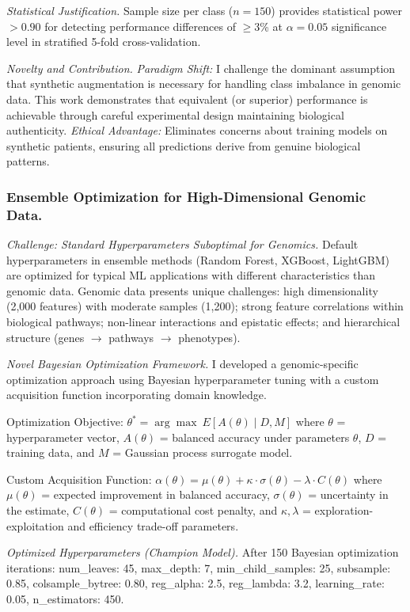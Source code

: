 \documentclass[manuscript, screen, review]{jair}
\begin{document}
\emph{Statistical Justification.} Sample size per class ($n=150$) provides statistical power $> 0.90$ for detecting performance differences of $\geq$3\% at $\alpha=0.05$ significance level in stratified 5-fold cross-validation.

\emph{Novelty and Contribution.} \emph{Paradigm Shift:} I challenge the dominant assumption that synthetic augmentation is necessary for handling class imbalance in genomic data. This work demonstrates that equivalent (or superior) performance is achievable through careful experimental design maintaining biological authenticity. \emph{Ethical Advantage:} Eliminates concerns about training models on synthetic patients, ensuring all predictions derive from genuine biological patterns.

\subsubsection{Ensemble Optimization for High-Dimensional Genomic Data.}
\label{sec:ensemble}

\emph{Challenge: Standard Hyperparameters Suboptimal for Genomics.} Default hyperparameters in ensemble methods (Random Forest, XGBoost, LightGBM) are optimized for typical ML applications with different characteristics than genomic data. Genomic data presents unique challenges: high dimensionality (2,000 features) with moderate samples (1,200); strong feature correlations within biological pathways; non-linear interactions and epistatic effects; and hierarchical structure (genes $\to$ pathways $\to$ phenotypes).

\emph{Novel Bayesian Optimization Framework.} I developed a genomic-specific optimization approach using Bayesian hyperparameter tuning with a custom acquisition function incorporating domain knowledge.

Optimization Objective: $\theta^* = \arg\max\ E[A(\theta) \mid D, M]$ where $\theta$ = hyperparameter vector, $A(\theta)$ = balanced accuracy under parameters $\theta$, $D$ = training data, and $M$ = Gaussian process surrogate model.

Custom Acquisition Function: $\alpha(\theta) = \mu(\theta) + \kappa \cdot \sigma(\theta) - \lambda \cdot C(\theta)$ where $\mu(\theta)$ = expected improvement in balanced accuracy, $\sigma(\theta)$ = uncertainty in the estimate, $C(\theta)$ = computational cost penalty, and $\kappa, \lambda$ = exploration-exploitation and efficiency trade-off parameters.

\emph{Optimized Hyperparameters (Champion Model).} After 150 Bayesian optimization iterations: num\_leaves: 45, max\_depth: 7, min\_child\_samples: 25, subsample: 0.85, colsample\_bytree: 0.80, reg\_alpha: 2.5, reg\_lambda: 3.2, learning\_rate: 0.05, n\_estimators: 450.
\end{document}
